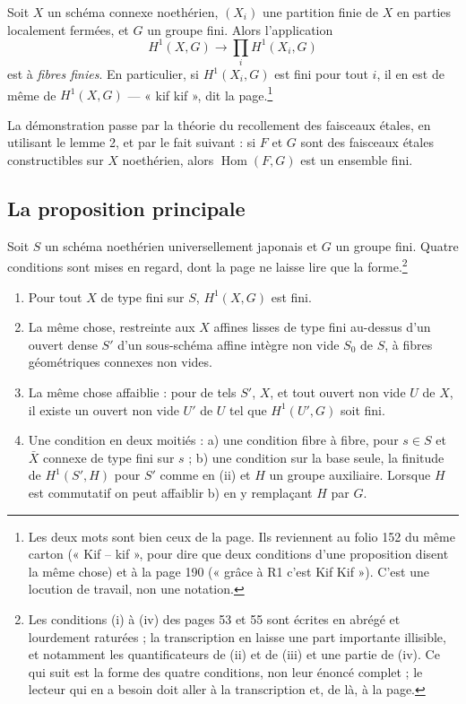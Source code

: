 \documentclass[11pt,a4paper]{article}
\begin{document}
Soit $X$ un schéma connexe noethérien, $(X_{i})$ une partition finie de $X$ en
parties localement fermées, et $G$ un groupe fini. Alors l'application
\[
  H^{1}(X, G) \longrightarrow \prod_{i} H^{1}(X_{i}, G)
\]
est à \emph{fibres finies}. En particulier, si $H^{1}(X_{i}, G)$ est fini pour
tout $i$, il en est de même de $H^{1}(X, G)$ --- « kif kif », dit la
page.\footnote{Les deux mots sont bien ceux de la page. Ils reviennent au
folio 152 du même carton (« Kif -- kif », pour dire que deux conditions d'une
proposition disent la même chose) et à la page 190 (« grâce à R1 c'est Kif
Kif »). C'est une locution de travail, non une notation.}

La démonstration passe par la théorie du recollement des faisceaux étales, en
utilisant le lemme 2, et par le fait suivant : si $F$ et $G$ sont des faisceaux
étales constructibles sur $X$ noethérien, alors $\operatorname{Hom}(F, G)$ est
un ensemble fini.

\subsection*{La proposition principale}

Soit $S$ un schéma noethérien universellement japonais et $G$ un groupe fini.
Quatre conditions sont mises en regard, dont la page ne laisse lire que la
forme.\footnote{Les conditions (i) à (iv) des pages 53 et 55 sont écrites en
abrégé et lourdement raturées ; la transcription en laisse une part importante
illisible, et notamment les quantificateurs de (ii) et de (iii) et une partie
de (iv). Ce qui suit est la forme des quatre conditions, non leur énoncé
complet ; le lecteur qui en a besoin doit aller à la transcription et, de là, à
la page.}

\begin{enumerate}
  \item[(i)] Pour tout $X$ de type fini sur $S$, $H^{1}(X, G)$ est fini.
  \item[(ii)] La même chose, restreinte aux $X$ affines lisses de type fini
    au-dessus d'un ouvert dense $S'$ d'un sous-schéma affine intègre non vide
    $S_{0}$ de $S$, à fibres géométriques connexes non vides.
  \item[(iii)] La même chose affaiblie : pour de tels $S'$, $X$, et tout ouvert
    non vide $U$ de $X$, il existe un ouvert non vide $U'$ de $U$ tel que
    $H^{1}(U', G)$ soit fini.
  \item[(iv)] Une condition en deux moitiés : a) une condition fibre à fibre,
    pour $s \in S$ et $\bar{X}$ connexe de type fini sur $s$ ; b) une condition
    sur la base seule, la finitude de $H^{1}(S', H)$ pour $S'$ comme en (ii) et
    $H$ un groupe auxiliaire. Lorsque $H$ est commutatif on peut affaiblir b)
    en y remplaçant $H$ par $G$.
\end{enumerate}
\end{document}
